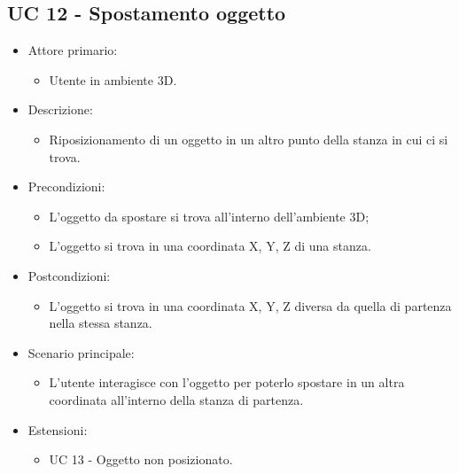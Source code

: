 \subsection{UC 12 - Spostamento oggetto}
\begin{itemize}

	\item Attore primario: 
	\begin{itemize}
		\item Utente in ambiente 3D.
	\end{itemize}
	\item Descrizione:
	\begin{itemize}
		\item Riposizionamento di un oggetto in un altro punto della stanza in cui ci si trova.
	\end{itemize}
	
	\item Precondizioni:
	\begin{itemize}
		\item L'oggetto da spostare si trova all'interno dell'ambiente 3D;
		\item L'oggetto si trova in una coordinata X, Y, Z di una stanza.
	\end{itemize}
	
	\item Postcondizioni:
	\begin{itemize}
		\item L'oggetto si trova in una coordinata X, Y, Z diversa da quella di partenza nella stessa stanza.
	\end{itemize}
	
	\item Scenario principale:
	\begin{itemize}
		\item L'utente interagisce con l'oggetto per poterlo spostare in un altra coordinata all'interno della stanza di partenza.
	\end{itemize}
	
	\item Estensioni:
	\begin{itemize}
		\item UC 13 - Oggetto non posizionato.
	\end{itemize}
	
\end{itemize}

\pagebreak

